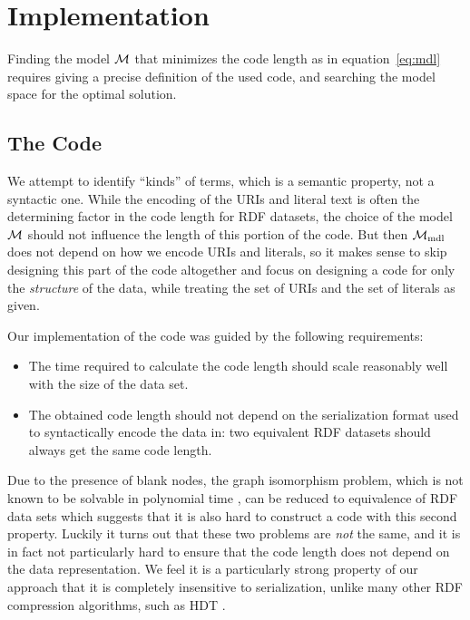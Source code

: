 \section{Implementation}
\label{sec:implementation}

Finding the model ${\mathcal M}$ that minimizes the code length as
 in equation~\eqref{eq:mdl} requires giving a precise definition of
 the used code, and searching the model space for the optimal solution.

\subsection{The Code}

We attempt to identify ``kinds'' of terms, which is a semantic property,
 not a syntactic one.
While the encoding of the URIs and literal text is often
 the determining factor in the code length for RDF datasets,
 the choice of the model ${\mathcal M}$ should not influence the length of this portion
 of the code.
But then ${\mathcal M}_\textnormal{mdl}$ does not depend on how we encode URIs and literals,
 so it makes sense to skip designing this part of the code altogether
 and focus on designing a code for only the \emph{structure} of the data,
 while treating the set of URIs and the set of literals as given.

Our implementation of the code was guided by the following requirements:

\begin{itemize}
\item The time required to calculate the code length should scale
      reasonably well with the size of the data set.
\item The obtained code length should not depend on the serialization format
      used to syntactically encode the data in: two equivalent RDF datasets
      should always get the same code length.
\end{itemize}

Due to the presence of blank nodes, the graph isomorphism problem,
 which is not known to be solvable in polynomial time \cite{Garey1990},
 can be reduced to equivalence of RDF data sets which suggests that it
 is also hard to construct a code with this second property.
Luckily it turns out that these two problems are \emph{not} the same,
 and it is in fact not particularly hard to ensure that the code length
 does not depend on the data representation.
We feel it is a particularly strong property of our approach that it is
 completely insensitive to serialization,
 unlike many other RDF compression algorithms,
 such as HDT \cite{Fernandez2013}.


